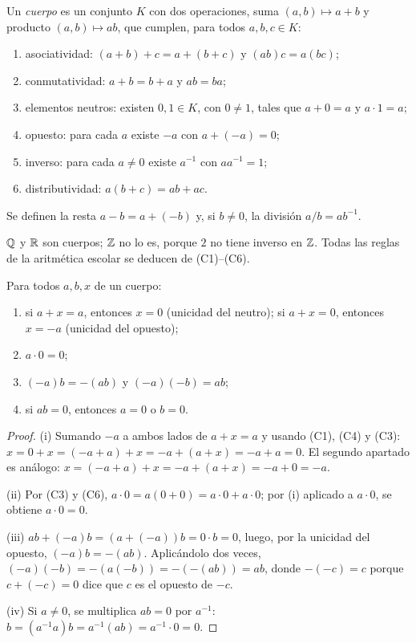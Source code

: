 \begin{definicion}[Cuerpo]\label{def:cuerpo}
Un \emph{cuerpo} es un conjunto $K$ con dos operaciones, suma $(a,b)\mapsto a+b$ y producto $(a,b)\mapsto ab$, que cumplen, para todos $a,b,c\in K$:
\begin{enumerate}[label=(C\arabic*)]
  \item asociatividad: $(a+b)+c=a+(b+c)$ y $(ab)c=a(bc)$;
  \item conmutatividad: $a+b=b+a$ y $ab=ba$;
  \item elementos neutros: existen $0,1\in K$, con $0\neq 1$, tales que $a+0=a$ y $a\cdot 1=a$;
  \item opuesto: para cada $a$ existe $-a$ con $a+(-a)=0$;
  \item inverso: para cada $a\neq 0$ existe $a^{-1}$ con $aa^{-1}=1$;
  \item distributividad: $a(b+c)=ab+ac$.
\end{enumerate}
Se definen la resta $a-b=a+(-b)$ y, si $b\neq 0$, la división $a/b=ab^{-1}$.
\end{definicion}

$\mathbb{Q}$ y $\mathbb{R}$ son cuerpos; $\mathbb{Z}$ no lo es, porque $2$ no tiene inverso en $\mathbb{Z}$. Todas las reglas de la aritmética escolar se deducen de (C1)--(C6).

\begin{proposicion}\label{prop:cuerpo}
Para todos $a,b,x$ de un cuerpo:
\begin{enumerate}
  \item si $a+x=a$, entonces $x=0$ (unicidad del neutro); si $a+x=0$, entonces $x=-a$ (unicidad del opuesto);
  \item $a\cdot 0=0$;
  \item $(-a)b=-(ab)$ y $(-a)(-b)=ab$;
  \item si $ab=0$, entonces $a=0$ o $b=0$.
\end{enumerate}
\end{proposicion}

\begin{proof}
(i) Sumando $-a$ a ambos lados de $a+x=a$ y usando (C1), (C4) y (C3): $x=0+x=(-a+a)+x=-a+(a+x)=-a+a=0$. El segundo apartado es análogo: $x=(-a+a)+x=-a+(a+x)=-a+0=-a$.

(ii) Por (C3) y (C6), $a\cdot 0=a(0+0)=a\cdot 0+a\cdot 0$; por (i) aplicado a $a\cdot 0$, se obtiene $a\cdot 0=0$.

(iii) $ab+(-a)b=(a+(-a))b=0\cdot b=0$, luego, por la unicidad del opuesto, $(-a)b=-(ab)$. Aplicándolo dos veces, $(-a)(-b)=-(a(-b))=-(-(ab))=ab$, donde $-(-c)=c$ porque $c+(-c)=0$ dice que $c$ es el opuesto de $-c$.

(iv) Si $a\neq 0$, se multiplica $ab=0$ por $a^{-1}$: $b=(a^{-1}a)b=a^{-1}(ab)=a^{-1}\cdot 0=0$.
\end{proof}

